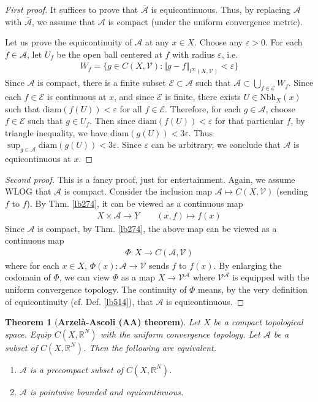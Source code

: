 \documentclass[12pt,b5paper,notitlepage]{article}
\theoremstyle{definition}
\theoremstyle{plain}
\newtheorem{thm}[df]{Theorem}
\newcommand{\mc}{\mathcal}
\newcommand{\ovl}{\overline}
\newcommand{\scr}{\mathscr}
\newcommand{\Rbb}{\mathbb R}
\newcommand{\Nbh}{\mathrm{Nbh}}
\newcommand{\diam}{\mathrm{diam}}
\newcommand{\eps}{\varepsilon}
\numberwithin{equation}{section}
\begin{document}
\begin{proof}[First proof]
It suffices to prove that $\ovl{\scr A}$ is equicontinuous. Thus, by replacing $\scr A$ with $\ovl{\scr A}$, we assume that $\scr A$ is compact (under the uniform convergence metric).

Let us prove the equicontinuity of $\scr A$ at any $x\in X$. Choose any $\eps>0$. For each $f\in\scr A$, let $U_f$ be the open ball centered at $f$ with radius $\eps$, i.e.
\begin{align*}
W_f=\big\{g\in C(X,\mc V):\Vert g-f\Vert_{l^\infty(X,\mc V)}<\eps\big\}
\end{align*}
Since $\scr A$ is compact, there is a finite subset $\mc E\subset\scr A$ such that $\scr A\subset\bigcup_{f\in\mc E}W_f$. Since each $f\in\mc E$ is continuous at $x$, and since $\mc E$ is finite, there exists $U\in\Nbh_X(x)$ such that $\diam(f(U))<\eps$ for all $f\in\mc E$. Therefore, for each $g\in\scr A$, choose $f\in\mc E$ such that $g\in U_f$. Then since $\diam (f(U))<\eps$ for that particular $f$, by triangle inequality, we have $\diam (g(U))<3\eps$. Thus $\sup_{g\in\scr A}\diam(g(U))<3\eps$. Since $\eps$ can be arbitrary, we conclude that $\scr A$ is equicontinuous at $x$.
\end{proof}



\begin{proof}[Second proof]
This is a fancy proof, just for entertainment. Again, we assume WLOG that $\scr A$ is compact. Consider the inclusion map $\scr A\mapsto C(X,\mc V)$ (sending $f$ to $f$). By Thm. \ref{lb274}, it can be viewed as a continuous map
\begin{gather*}
X\times\scr A\rightarrow Y\qquad (x,f)\mapsto f(x)
\end{gather*}
Since $\scr A$ is compact, by Thm. \ref{lb274}, the above map can be viewed as a continuous map
\begin{align*}
\Phi:X\rightarrow C(\scr A,\mc V)
\end{align*}
where for each $x\in X$, $\Phi(x):\scr A\rightarrow \mc V$ sends $f$ to $f(x)$. By enlarging the codomain of $\Phi$, we can view $\Phi$ as a map $X\rightarrow \mc V^{\scr A}$ where $\mc V^{\scr A}$ is equipped with the uniform convergence topology. The continuity of $\Phi$ means, by the very definition of equicontinuity (cf. Def. \ref{lb514}), that $\scr A$ is equicontinuous.
\end{proof}



\begin{thm}[\textbf{Arzel\`a-Ascoli (AA) theorem}] \label{lb516}
Let $X$ be a compact topological space. Equip $C(X,\Rbb^N)$ with the uniform convergence topology. Let $\scr A$ be a subset of $C(X,\Rbb^N)$. Then the following are equivalent.
\begin{enumerate}[label=(\arabic*)]
\item $\scr A$ is a precompact subset of $C(X,\Rbb^N)$.
\item $\scr A$ is pointwise bounded and equicontinuous.
\end{enumerate}
\end{thm}
\end{document}

